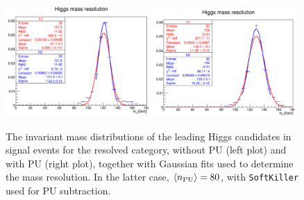 \begin{figure}[t]
  \begin{center}
    \vspace{-1cm}
  \includegraphics[width=0.49\textwidth]{plots/higgs_mass_res_noPU.pdf}
  \includegraphics[width=0.49\textwidth]{plots/higgs_mass_res_PU80.pdf}
  \caption{\small The invariant mass distributions of the leading
    Higgs candidates in signal events for the resolved category, without
    PU (left plot) and with PU (right plot),
    together with Gaussian fits  used to determine the mass resolution.
    In the latter case, $\left\langle n_{\rm PU}\right\rangle=80$, with {\tt SoftKiller}
     used for PU subtraction.
}
\label{fig:higgs-mass-resolution}
\end{center}
\end{figure}





